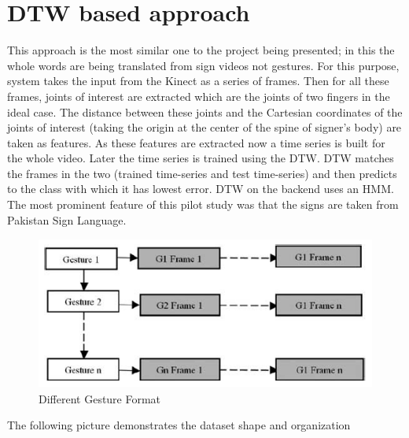 \section{DTW based approach}
This approach is the most similar one to the project being presented; in this the whole words are being translated from sign videos not gestures. For this purpose, system takes the input from the Kinect as a series of frames. Then for all these frames, joints of interest are extracted which are the joints of two fingers in the ideal case. The distance between these joints and the Cartesian coordinates of the joints of interest (taking the origin at the center of the spine of signer’s body) are taken as features. As these features are extracted now a time series is built for the whole video. Later the time series is trained using the DTW. DTW matches the frames in the two (trained time-series and test time-series) and then predicts to the class with which it has lowest error. DTW on the backend uses an HMM. The most prominent feature of this pilot study was that the signs are taken from Pakistan Sign Language. \cite{no5}

\begin{figure}[!htb]
	\begin{center}
		\includegraphics[height=5cm, width=12cm]{ThesisFigs/differentgesture}
		\caption{Different Gesture Format}\label{fig:Different Gesture}
	\end{center}
\end{figure}
The following picture demonstrates the dataset shape and organization





